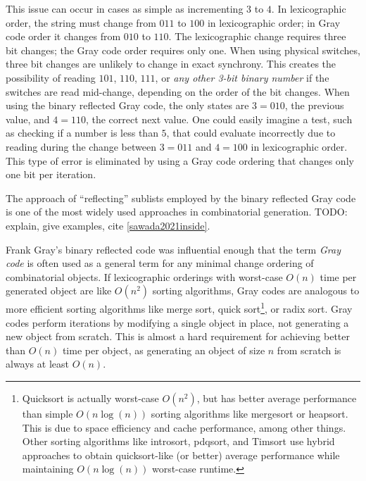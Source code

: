 This issue can occur in cases as simple as incrementing $3$ to $4$.  In lexicographic order, the string must change from $011$ to $100$ in lexicographic order; in Gray code order it changes from $010$ to $110$.  The lexicographic change requires three bit changes; the Gray code order requires only one.  When using physical switches, three bit changes are unlikely to change in exact synchrony.  This creates the possibility of reading $101$, $110$, $111$, or \emph{any other 3-bit binary number} if the switches are read mid-change, depending on the order of the bit changes.  When using the binary reflected Gray code, the only states are $3=010$, the previous value, and $4=110$, the correct next value. One could easily imagine a test, such as checking if a number is less than $5$, that could evaluate incorrectly due to reading during the change between $3=011$ and $4=100$ in lexicographic order.  This type of error is eliminated by using a Gray code ordering that changes only one bit per iteration.

The approach of ``reflecting'' sublists employed by the binary reflected Gray code is one of the most widely used approaches in combinatorial generation. TODO: explain, give examples, cite \ref{sawada2021inside}.

Frank Gray's binary reflected code was influential enough that the term \emph{Gray code} is often used as a general term for any minimal change ordering of combinatorial objects.  If lexicographic orderings with worst-case $O(n)$ time per generated object are like $O(n^2)$ sorting algorithms, Gray codes are analogous to more efficient sorting algorithms like merge sort, quick sort\footnote{Quicksort is actually worst-case $O(n^2)$, but has better average performance than simple $O(n \log(n))$ sorting algorithms like mergesort or heapsort.  This is due to space efficiency and cache performance, among other things.  Other sorting algorithms like introsort, pdqsort, and Timsort use hybrid approaches to obtain quicksort-like (or better) average performance while maintaining $O(n \log(n))$ worst-case runtime.}, or radix sort.  Gray codes perform iterations by modifying a single object in place, not generating a new object from scratch.  This is almost a hard requirement for achieving better than $O(n)$ time per object, as generating an object of size $n$ from scratch is always at least $O(n)$.



